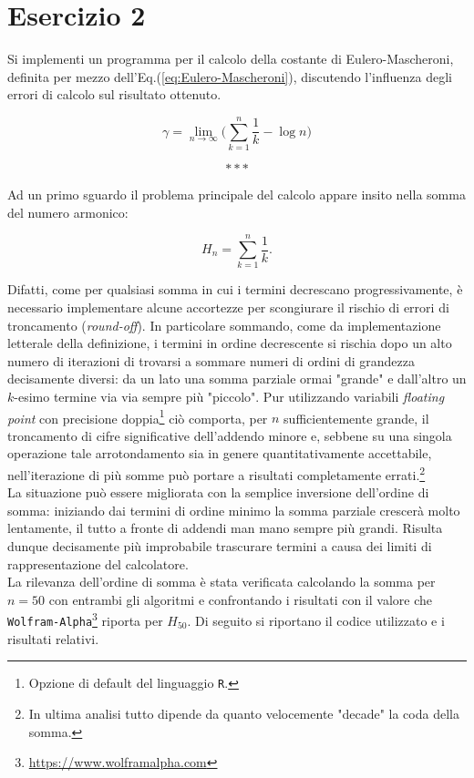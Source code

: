\section{Esercizio 2}

Si implementi un programma per il calcolo della costante di Eulero-Mascheroni, definita per mezzo dell'Eq.(\ref{eq:Eulero-Mascheroni}), discutendo l'influenza degli errori di calcolo sul risultato ottenuto. 

\begin{equation}
\gamma = \lim_{n \to\infty}\Biggl(\sum_{k=1}^{n}\frac{1}{k} - \log n\Biggr)
\label{eq:Eulero-Mascheroni}
\end{equation}

\[* * * \] %

\noindent Ad un primo sguardo il problema principale del calcolo appare insito nella somma del numero armonico:

$$H_n = \sum_{k=1}^{n}\frac{1}{k}.$$

\noindent Difatti, come per qualsiasi somma in cui i termini decrescano progressivamente, è necessario implementare alcune accortezze per scongiurare il rischio di errori di troncamento (\emph{round-off}). In particolare sommando, come da implementazione letterale della definizione, i termini in ordine decrescente si rischia dopo un alto numero di iterazioni di trovarsi a sommare numeri di ordini di grandezza decisamente diversi: da un lato una somma parziale ormai "grande" e dall'altro un $k$-esimo termine via via sempre più "piccolo". Pur utilizzando variabili \emph{floating point} con precisione doppia\footnote{Opzione di default del linguaggio \texttt{R}.} ciò comporta, per $n$ sufficientemente grande, il troncamento di cifre significative dell'addendo minore e, sebbene su una singola operazione tale arrotondamento sia in genere quantitativamente accettabile, nell'iterazione di più somme può portare a risultati completamente errati.\footnote{In ultima analisi tutto dipende da quanto velocemente "decade" la coda della somma.}\\
La situazione può essere migliorata con la semplice inversione dell'ordine di somma: iniziando dai termini di ordine minimo la somma parziale crescerà molto lentamente, il tutto a fronte di addendi man mano sempre più grandi. Risulta dunque decisamente più improbabile trascurare termini a causa dei limiti di rappresentazione del calcolatore. \\

\noindent La rilevanza dell'ordine di somma è stata verificata calcolando la somma per $n=50$ con entrambi gli algoritmi e confrontando i risultati con il valore che \texttt{Wolfram-Alpha}\footnote{\url{https://www.wolframalpha.com}} riporta per $H_{50}$. Di seguito si riportano il codice utilizzato e i risultati relativi.\\

